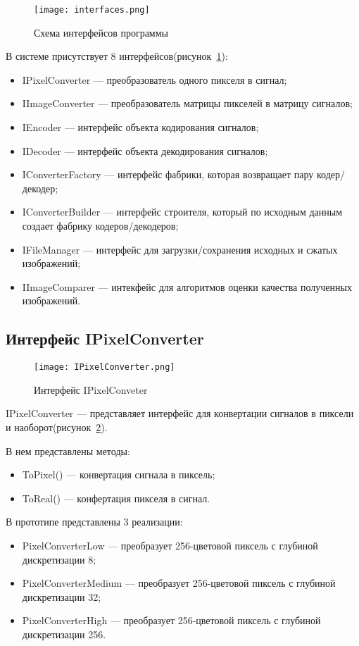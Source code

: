 \begin{figure}[ht]
\centering
  \texttt{[image: interfaces.png]}
  \caption{ Схема интерфейсов программы }
  \label{fig:interfaces}
\end{figure}
В системе присутствует 8 интерфейсов(рисунок~\ref{fig:interfaces}):
\begin{itemize}
  \item IPixelConverter --- преобразователь одного пикселя в сигнал;
  \item IImageConverter --- преобразователь матрицы пикселей в матрицу сигналов;
  \item IEncoder --- интерфейс объекта кодирования сигналов;
  \item IDecoder --- интерфейс объекта декодирования сигналов;
  \item IConverterFactory --- интерфейс фабрики, которая возвращает пару кодер/декодер;
  \item IConverterBuilder --- интерфейс строителя, который по исходным данным создает фабрику кодеров/декодеров;
  \item IFileManager --- интерфейс для загрузки/сохранения исходных и сжатых изображений;
  \item IImageComparer --- интекфейс для алгоритмов оценки качества полученных изображений.
\end{itemize}

\subsection{Интерфейс IPixelConverter}
\label{subsub:development:ipixelconverter}

\begin{figure}[ht]
\centering
  \texttt{[image: IPixelConverter.png]}
  \caption{ Интерфейс IPixelConveter }
  \label{fig:ipixelconverter}
\end{figure}
IPixelConverter --- представляет интерфейс для конвертации сигналов в пиксели и наоборот(рисунок~\ref{fig:ipixelconverter}).

В нем представлены методы:
\begin{itemize}
  \item ToPixel() --- конвертация сигнала в пиксель;
  \item ToReal() --- конфертация пикселя в сигнал.
\end{itemize}

В прототипе представлены 3 реализации:
\begin{itemize}
  \item PixelConverterLow --- преобразует 256-цветовой пиксель с глубиной дискретизации 8;
  \item PixelConverterMedium --- преобразует 256-цветовой пиксель с глубиной дискретизации 32;
  \item PixelConverterHigh --- преобразует 256-цветовой пиксель с глубиной дискретизации 256.
\end{itemize}

